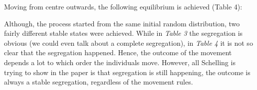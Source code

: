 \documentclass[../main.tex]{subfiles}
\begin{document}
Moving from centre outwards, the following equilibrium is achieved (Table 4):

\begin{table}[H]
\begin{center}
\end{center}
\caption{Stable segregation - moving from centre outwards} 
\end{table}

Although, the process started from the same initial random distribution, two fairly different stable states were achieved. While in \textit{Table 3} the segregation is obvious (we could even talk about a complete segregation), in \textit{Table 4} it is not so clear that the segregation happened. Hence, the outcome of the movement depends a lot to which order the individuals move. However, all Schelling is trying to show in the paper is that segregation is still happening, the outcome is always a stable segregation, regardless of the movement rules.
\end{document}
